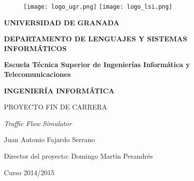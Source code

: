 \begin{titlepage}

	\begin{figure}[htbp] 
		\centering 
		\texttt{[image: logo\_ugr.png]}
		\hspace{3.0cm}
		\texttt{[image: logo\_lsi.png]}
	\end{figure}
    
	\begin{center}
	
		\vspace{1.0cm}
		
		\LARGE{\textbf{UNIVERSIDAD DE GRANADA}} \\
		
		\vspace{1.0cm}
		
		\LARGE{\textbf{DEPARTAMENTO DE LENGUAJES Y SISTEMAS INFORMÁTICOS}} \\
		
		\vspace{1.0cm}
		
		\textbf{Escuela Técnica Superior de Ingenierías Informática y Telecomunicaciones} \\
		
		\vspace{1.0cm}
		
		\Large{\textbf{INGENIERÍA INFORMÁTICA}} \\
		
		\vspace{1.0cm}
		
		\Large{PROYECTO FIN DE CARRERA} \\
		
		\vspace{0.5cm}

		\Large{\emph{Traffic Flow Simulator}} \\
		
		\vspace{1.5cm}
		
		\Large{Juan Antonio Fajardo Serrano} \\
		
		\vspace{0.5cm}
		
		\Large{Director del proyecto: Domingo Martín Perandrés} \\
		
		\vspace{0.5cm}
		
		\large{Curso 2014/2015}
		
	\end{center}
\end{titlepage}